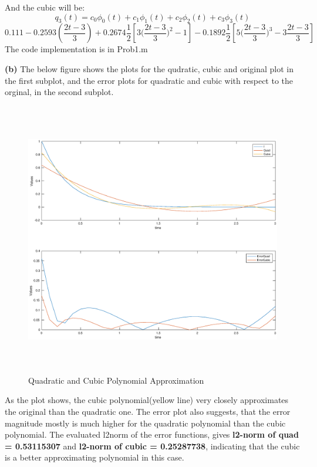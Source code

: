 \documentclass{article}
\renewcommand\part[1]{\vspace{.10in}\textbf{(#1)}}
\begin{document}
  And the cubic will be:
  \[q_3(t) = c_0\phi_0(t) + c_1\phi_1(t) + c_2\phi_2(t) + c_3\phi_3(t) \] \[ 0.111 - 0.2593(\dfrac{2t-3}{3}) + 0.2674\dfrac{1}{2}[3\bigg (\dfrac{2t-3}{3}\bigg )^2 - 1] -0.1892\dfrac{1}{2}[5\bigg (  \dfrac{2t-3}{3}\bigg )^3 - 3\dfrac{2t-3}{3}]\]
	The code implementation is in Prob1.m

  \part{b} The below figure shows the plots for the qudratic, cubic and original plot in the first subplot, and the error plots for quadratic and cubic with respect to the orginal, in the second subplot.
  \begin{figure}[H]
   \centering
  \includegraphics[width=12cm, height=12cm]{Prob1}
  \caption{Quadratic and Cubic Polynomial Approximation}
  \end{figure}

  As the plot shows, the cubic polynomial(yellow line) very closely approximates the original than the quadratic one. The error plot also suggests, that the error magnitude mostly is much higher for the quadratic polynomial than the cubic polynomial. The evaluated l2norm of the error functions, gives \textbf {l2-norm of quad = 0.53115307} and \textbf{l2-norm of cubic = 0.25287738}, indicating that the cubic is a better approximating polynomial in this case. \newline
\end{document}
